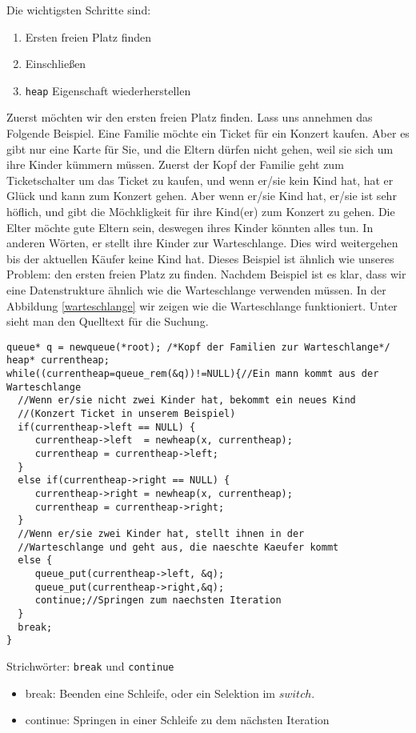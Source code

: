 Die wichtigsten Schritte sind:
\begin{enumerate}
\item Ersten freien Platz finden
\item Einschließen
\item \texttt{heap} Eigenschaft wiederherstellen
\end{enumerate}
Zuerst möchten wir den ersten freien Platz finden. Lass uns annehmen
das Folgende Beispiel. Eine Familie möchte ein Ticket für ein Konzert kaufen.
Aber es gibt nur eine Karte für Sie, und die Eltern dürfen nicht gehen, weil sie sich 
um ihre Kinder kümmern müssen. Zuerst der Kopf der Familie geht zum Ticketschalter
um das Ticket zu kaufen, und wenn er/sie  kein Kind hat, hat er Glück und
kann zum Konzert gehen. Aber wenn er/sie Kind hat, er/sie ist sehr höflich, und 
gibt die Möchkligkeit für ihre Kind(er) zum Konzert zu gehen. Die Elter möchte 
gute Eltern sein, deswegen ihres Kinder könnten alles tun. In anderen Wörten, er
stellt ihre Kinder zur Warteschlange. Dies wird weitergehen bis der aktuellen Käufer 
keine Kind hat. Dieses Beispiel ist ähnlich wie unseres Problem: den ersten freien 
Platz zu finden. Nachdem Beispiel ist es klar, dass wir eine Datenstrukture ähnlich wie 
die Warteschlange verwenden müssen. In der Abbildung \ref{warteschlange} wir zeigen wie 
die Warteschlange funktioniert. Unter sieht man den Quelltext für die Suchung.


\begin{lstlisting}
queue* q = newqueue(*root); /*Kopf der Familien zur Warteschlange*/
heap* currentheap; 
while((currentheap=queue_rem(&q))!=NULL){//Ein mann kommt aus der Warteschlange
  //Wenn er/sie nicht zwei Kinder hat, bekommt ein neues Kind
  //(Konzert Ticket in unserem Beispiel)
  if(currentheap->left == NULL) {
     currentheap->left  = newheap(x, currentheap);
     currentheap = currentheap->left;
  }
  else if(currentheap->right == NULL) {
     currentheap->right = newheap(x, currentheap);
     currentheap = currentheap->right;
  }
  //Wenn er/sie zwei Kinder hat, stellt ihnen in der 
  //Warteschlange und geht aus, die naeschte Kaeufer kommt
  else {
     queue_put(currentheap->left, &q);
     queue_put(currentheap->right,&q);
     continue;//Springen zum naechsten Iteration
  }
  break;
}
\end{lstlisting}
\begin{myexampleblock}{Strichwörter: \texttt{break} und \texttt{continue}}
\begin{itemize}
\item break: Beenden eine Schleife, oder ein Selektion im $switch$.
\item continue: Springen in einer Schleife zu dem nächsten Iteration
\end{itemize}
\end{myexampleblock}


